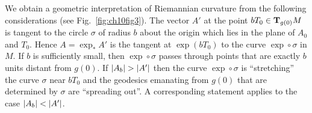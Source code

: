 \documentclass[../main]{subfiles}
\begin{document}
We obtain a geometric interpretation of Riemannian curvature from the following considerations (see Fig.~\ref{fig:ch10fig3}). The vector $A'$ at the point $bT_0\in\ts{M}{g(0)}$ is tangent to the circle $\sigma$ of radius $b$ about the origin which lies in the plane of $A_0$ and $T_0$. Hence $A=\exp_*A'$ is the tangent at $\exp(bT_0)$ to the curve $\exp\circ\sigma$ in $M$. If $b$ is sufficiently small, then $\exp\circ\sigma$ passes through points that are exactly $b$ units distant from $g(0)$. If $\norm{A_b}>\norm{A'}$ then the curve $\exp\circ\sigma$ is ``stretching'' the curve $\sigma$ near $bT_0$ and the geodesics emanating from $g(0)$ that are determined by $\sigma$ are ``spreading out''. A corresponding statement applies to the case $\norm{A_b}<\norm{A'}$.

\end{document}
